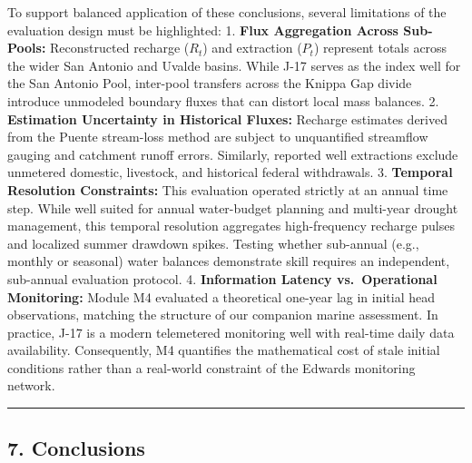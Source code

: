 \documentclass[11pt]{article}
\begin{document}
To support balanced application of these conclusions, several
limitations of the evaluation design must be highlighted: 1.
\textbf{Flux Aggregation Across Sub-Pools:} Reconstructed recharge
(\(R_t\)) and extraction (\(P_t\)) represent totals across the wider San
Antonio and Uvalde basins. While J-17 serves as the index well for the
San Antonio Pool, inter-pool transfers across the Knippa Gap divide
introduce unmodeled boundary fluxes that can distort local mass
balances. 2. \textbf{Estimation Uncertainty in Historical Fluxes:}
Recharge estimates derived from the Puente stream-loss method are
subject to unquantified streamflow gauging and catchment runoff errors.
Similarly, reported well extractions exclude unmetered domestic,
livestock, and historical federal withdrawals. 3. \textbf{Temporal
Resolution Constraints:} This evaluation operated strictly at an annual
time step. While well suited for annual water-budget planning and
multi-year drought management, this temporal resolution aggregates
high-frequency recharge pulses and localized summer drawdown spikes.
Testing whether sub-annual (e.g., monthly or seasonal) water balances
demonstrate skill requires an independent, sub-annual evaluation
protocol. 4. \textbf{Information Latency vs.~Operational Monitoring:}
Module M4 evaluated a theoretical one-year lag in initial head
observations, matching the structure of our companion marine assessment.
In practice, J-17 is a modern telemetered monitoring well with real-time
daily data availability. Consequently, M4 quantifies the mathematical
cost of stale initial conditions rather than a real-world constraint of
the Edwards monitoring network.

\begin{center}\rule{0.5\linewidth}{0.5pt}\end{center}

\subsection{7. Conclusions}\label{conclusions}
\end{document}
